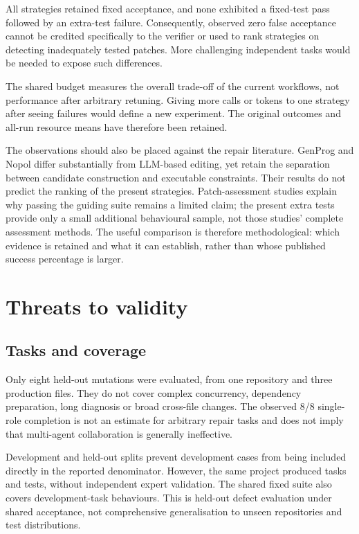 All strategies retained fixed acceptance, and none exhibited a fixed-test pass followed by an extra-test failure. Consequently, observed zero false acceptance cannot be credited specifically to the verifier or used to rank strategies on detecting inadequately tested patches. More challenging independent tasks would be needed to expose such differences.

The shared budget measures the overall trade-off of the current workflows, not performance after arbitrary retuning. Giving more calls or tokens to one strategy after seeing failures would define a new experiment. The original outcomes and all-run resource means have therefore been retained.

The observations should also be placed against the repair literature. GenProg and Nopol differ substantially from LLM-based editing, yet retain the separation between candidate construction and executable constraints. Their results do not predict the ranking of the present strategies. Patch-assessment studies explain why passing the guiding suite remains a limited claim; the present extra tests provide only a small additional behavioural sample, not those studies' complete assessment methods. The useful comparison is therefore methodological: which evidence is retained and what it can establish, rather than whose published success percentage is larger. \citep{legoues2012genprog, xuan2017nopol, ye2021assessment}

\section{Threats to validity}\label{sec:7.4}

\subsection{Tasks and coverage}\label{sec:7.4.1}

Only eight held-out mutations were evaluated, from one repository and three production files. They do not cover complex concurrency, dependency preparation, long diagnosis or broad cross-file changes. The observed 8/8 single-role completion is not an estimate for arbitrary repair tasks and does not imply that multi-agent collaboration is generally ineffective.

Development and held-out splits prevent development cases from being included directly in the reported denominator. However, the same project produced tasks and tests, without independent expert validation. The shared fixed suite also covers development-task behaviours. This is held-out defect evaluation under shared acceptance, not comprehensive generalisation to unseen repositories and test distributions.

